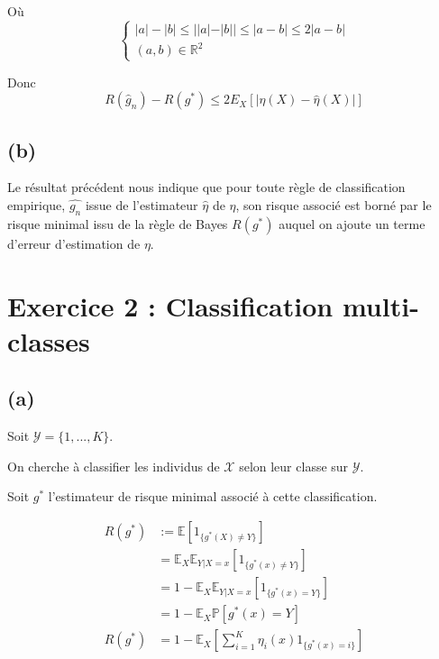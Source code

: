 \documentclass[
]{article}
\begin{document}
Où\\
\[
\begin{cases}
|a|-|b|\leqslant||a|-|b||\leqslant| a-b|\leqslant 2| a-b| \\
(a, b) \in \mathbb{R}^2
\end{cases}
\]

Donc
\[\boxed{R\left(\hat{g}_n\right)-R\left(g^*\right) \leqslant 2 E_X\left[\left| \eta(X)-\hat{\eta}(X)\right| \right]}\]

\hypertarget{b}{%
\subsection{(b)}\label{b}}

Le résultat précédent nous indique que pour toute règle de
classification empirique, \(\hat{g_n}\) issue de l'estimateur
\(\hat{\eta}\) de \(\eta\), son risque associé est borné par le risque
minimal issu de la règle de Bayes \(R(g^*)\) auquel on ajoute un terme
d'erreur d'estimation de \(\eta\).

\hypertarget{exercice-2-classification-multi-classes}{%
\section{Exercice 2 : Classification
multi-classes}\label{exercice-2-classification-multi-classes}}

\hypertarget{a-1}{%
\subsection{(a)}\label{a-1}}

Soit \(\mathcal{Y}= \{1, ..., K\}\).

On cherche à classifier les individus de \(\mathcal{X}\) selon leur
classe sur \(\mathcal{Y}\).

Soit \(g^*\) l'estimateur de risque minimal associé à cette
classification.

\begin{align*}
R(g^*)    &:= \mathbb{E}\left[{1}_{\{g^*(X) \neq Y \}}\right]\\
          &= \mathbb{E}_X \mathbb{E}_{Y|X=x}\left[{1}_{\{g^*(x) \neq Y \}}\right]\\
          &= 1 - \mathbb{E}_X \mathbb{E}_{Y|X=x}\left[{1}_{\{g^*(x) = Y \}}\right]\\
          &= 1 - \mathbb{E}_X \mathbb{P} \left[g^*(x) = Y\right]\\
R(g^*)    &= 1 - \mathbb{E}_X \left[\sum_{i=1}^K \eta_i(x) {1}_{\{g^*(x) = i\}}\right]
\end{align*}
\end{document}
